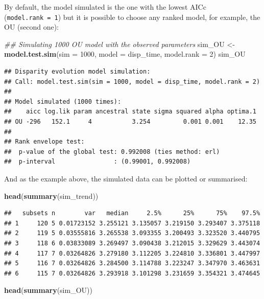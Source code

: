 \documentclass[
]{book}
\newenvironment{Shaded}{\begin{snugshade}}{\end{snugshade}}
\newcommand{\CommentTok}[1]{\textcolor[rgb]{0.56,0.35,0.01}{\textit{#1}}}
\newcommand{\DataTypeTok}[1]{\textcolor[rgb]{0.13,0.29,0.53}{#1}}
\newcommand{\DecValTok}[1]{\textcolor[rgb]{0.00,0.00,0.81}{#1}}
\newcommand{\KeywordTok}[1]{\textcolor[rgb]{0.13,0.29,0.53}{\textbf{#1}}}
\newcommand{\NormalTok}[1]{#1}
\newcommand{\StringTok}[1]{\textcolor[rgb]{0.31,0.60,0.02}{#1}}
\begin{document}
By default, the model simulated is the one with the lowest AICc (\texttt{model.rank\ =\ 1}) but it is possible to choose any ranked model, for example, the OU (second one):

\begin{Shaded}
\begin{Highlighting}[]
\CommentTok{\#\# Simulating 1000 OU model with the observed parameters}
\NormalTok{sim\_OU \textless{}{-}}\StringTok{ }\KeywordTok{model.test.sim}\NormalTok{(}\DataTypeTok{sim =} \DecValTok{1000}\NormalTok{, }\DataTypeTok{model =}\NormalTok{ disp\_time,}
                         \DataTypeTok{model.rank =} \DecValTok{2}\NormalTok{)}
\NormalTok{sim\_OU}
\end{Highlighting}
\end{Shaded}

\begin{verbatim}
## Disparity evolution model simulation:
## Call: model.test.sim(sim = 1000, model = disp_time, model.rank = 2) 
## 
## Model simulated (1000 times):
##    aicc log.lik param ancestral state sigma squared alpha optima.1
## OU -296   152.1     4           3.254         0.001 0.001    12.35
## 
## Rank envelope test:
##  p-value of the global test: 0.992008 (ties method: erl)
##  p-interval                : (0.99001, 0.992008)
\end{verbatim}

And as the example above, the simulated data can be plotted or summarised:

\begin{Shaded}
\begin{Highlighting}[]
\KeywordTok{head}\NormalTok{(}\KeywordTok{summary}\NormalTok{(sim\_trend))}
\end{Highlighting}
\end{Shaded}

\begin{verbatim}
##   subsets n        var   median     2.5%      25%      75%    97.5%
## 1     120 5 0.01723152 3.255121 3.135057 3.219150 3.293407 3.375118
## 2     119 5 0.03555816 3.265538 3.093355 3.200493 3.323520 3.440795
## 3     118 6 0.03833089 3.269497 3.090438 3.212015 3.329629 3.443074
## 4     117 7 0.03264826 3.279180 3.112205 3.224810 3.336801 3.447997
## 5     116 7 0.03264826 3.284500 3.114788 3.223247 3.347970 3.463631
## 6     115 7 0.03264826 3.293918 3.101298 3.231659 3.354321 3.474645
\end{verbatim}

\begin{Shaded}
\begin{Highlighting}[]
\KeywordTok{head}\NormalTok{(}\KeywordTok{summary}\NormalTok{(sim\_OU))}
\end{Highlighting}
\end{Shaded}
\end{document}
